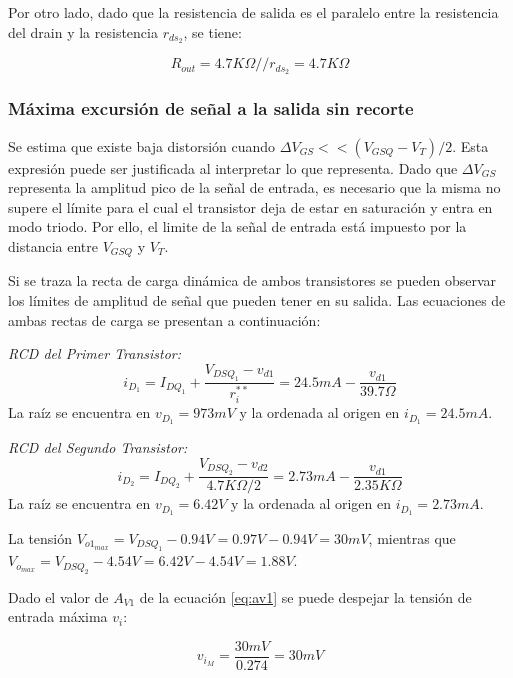 \documentclass[a4paper, 10pt, spanish]{article}
\begin{document}
Por otro lado, dado que la resistencia de salida es el paralelo entre la resistencia del drain y la resistencia $r_{ds_2}$, se tiene:

\begin{equation}
  R_{out}=4.7K\Omega // r_{ds_2} = 4.7K\Omega
\end{equation}

\subsubsection{Máxima excursión de señal a la salida sin recorte}

Se estima que existe baja distorsión cuando $\Delta V_{GS} << (V_{GSQ}-V_T)/2$. Esta expresión puede ser justificada al interpretar lo que representa. Dado que $\Delta V_{GS}$ representa la amplitud pico de la señal de entrada, es necesario que la misma no supere el límite para el cual el transistor deja de estar en saturación y entra en modo triodo. Por ello, el limite de la señal de entrada está impuesto por la distancia entre $V_{GSQ}$ y $V_T$.

Si se traza la recta de carga dinámica de ambos transistores se pueden observar los límites de amplitud de señal que pueden tener en su salida. Las ecuaciones de ambas rectas de carga se presentan a continuación:

\textit{RCD del Primer Transistor:}
\begin{equation}
  i_{D_1} = I_{DQ_1} + \frac{V_{DSQ_1} - v_{d1}}{r_i^{**}} = 24.5mA - \frac{v_{d1}}{39.7\Omega}
\end{equation}
La raíz se encuentra en $v_{D_1} = 973mV$ y la ordenada al origen en $i_{D_1} = 24.5mA$.

\textit{RCD del Segundo Transistor:}
\begin{equation}
  i_{D_2} = I_{DQ_2} + \frac{V_{DSQ_2} - v_{d2}}{4.7K\Omega/2} = 2.73mA - \frac{v_{d1}}{2.35K\Omega}
\end{equation}
La raíz se encuentra en $v_{D_1} = 6.42V$ y la ordenada al origen en $i_{D_1} = 2.73mA$.

La tensión $V_{o1_{max}}= V_{DSQ_1} - 0.94V = 0.97V - 0.94V = 30mV$, mientras que $V_{o_{max}}= V_{DSQ_2} - 4.54V = 6.42V - 4.54V = 1.88V$.

Dado el valor de $A_{V1}$ de la ecuación \ref{eq:av1} se puede despejar la tensión de entrada máxima $v_i$:

\begin{equation}
  v_{i_M}=\frac{30mV}{0.274}=30mV
  \label{eq:in_max_teo}
\end{equation}
\end{document}
